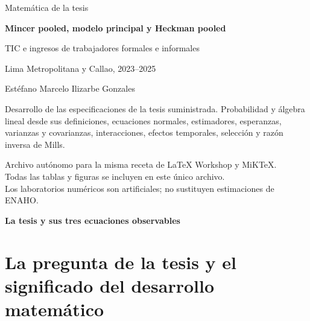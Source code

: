 \documentclass[11pt,a4paper]{article}
\begin{document}
\begin{titlepage}
\centering
{\Large\color{azul} Matemática de la tesis\par}
\vspace{8mm}
{\huge\bfseries Mincer pooled, modelo principal y Heckman pooled\par}
\vspace{5mm}
{\Large TIC e ingresos de trabajadores formales e informales\par}
\vspace{4mm}
{\large Lima Metropolitana y Callao, 2023--2025\par}
\vspace{5mm}
{\large Estéfano Marcelo Ilizarbe Gonzales\par}
\vspace{6mm}
\begin{idea}
Desarrollo de las especificaciones de la tesis suministrada. Probabilidad y álgebra lineal desde sus definiciones, ecuaciones normales, estimadores, esperanzas, varianzas y covarianzas, interacciones, efectos temporales, selección y razón inversa de Mills.
\end{idea}
\vspace{5mm}
\vfill
Archivo autónomo para la misma receta de LaTeX Workshop y MiKTeX.\\
Todas las tablas y figuras se incluyen en este único archivo.\\
Los laboratorios numéricos son artificiales; no sustituyen estimaciones de ENAHO.
\end{titlepage}
\tableofcontents
\clearpage
{}
{\large\bfseries\color{azul}La tesis y sus tres ecuaciones observables}\par\vspace{2mm}
\section{La pregunta de la tesis y el significado del desarrollo matemático}
\end{document}
